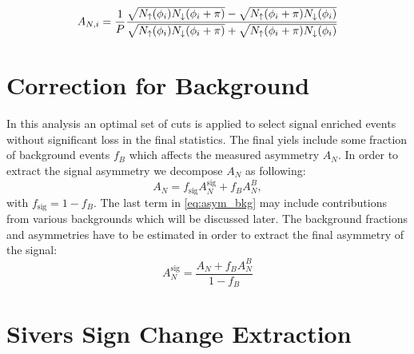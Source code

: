 \documentclass[12pt]{article}
\begin{document}
\begin{align}
A_{N, i} = \frac{1}{P} \frac{%
\sqrt{N_{\uparrow}(\phi_i)N_{\downarrow}(\phi_i+\pi)} -
\sqrt{N_{\uparrow}(\phi_i+\pi)N_{\downarrow}(\phi_i)}
}{%
\sqrt{N_{\uparrow}(\phi_i)N_{\downarrow}(\phi_i+\pi)} +
\sqrt{N_{\uparrow}(\phi_i+\pi)N_{\downarrow}(\phi_i)}
}
\label{eq:asym_sqrt}
\end{align}



\section{Correction for Background}

In this analysis an optimal set of cuts is applied to select signal enriched
events without significant loss in the final statistics. The final yiels include
some fraction of background events $f_B$ which affects the measured asymmetry
$A_N$. In order to extract the signal asymmetry we decompose $A_N$ as following:
%
\begin{equation}
A_N = f_\text{sig} A^\text{sig}_N + f_B A^B_N,
\label{eq:asym_bkg}
\end{equation}
%
with $f_\text{sig} = 1 - f_B$. The last term in \eqref{eq:asym_bkg} may include
contributions from various backgrounds which will be discussed later. The
background fractions and asymmetries have to be estimated in order to extract
the final asymmetry of the signal:
%
\begin{equation}
A^\text{sig}_N = \frac{A_N + f_B A^B_N}{1 - f_B}
\label{eq_bkg_corr}
\end{equation}



\section{Sivers Sign Change Extraction}
\end{document}
